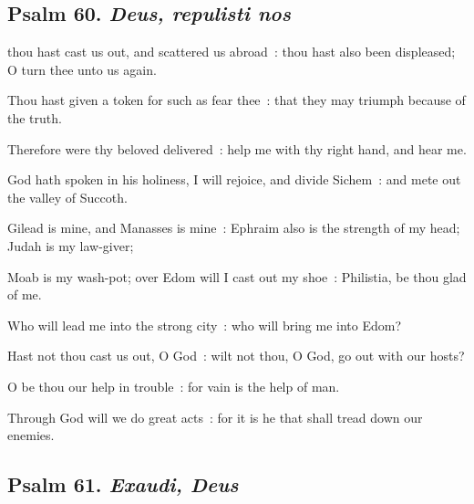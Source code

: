 \subsection{Psalm 60. \textit{Deus, repulisti nos}}

 thou hast cast us out, and scattered us abroad~: thou hast also been displeased; O turn thee unto us again.\par
{}
Thou hast given a token for such as fear thee~: that they may triumph because of the truth.\par
{}Therefore were thy beloved delivered~: help me with thy right hand, and hear me.\par
{}God hath spoken in his holiness, I will rejoice, and divide Sichem~: and mete out the valley of Succoth.\par
{}Gilead is mine, and Manasses is mine~: Ephraim also is the strength of my head; Judah is my law-giver;\par
{}Moab is my wash-pot; over Edom will I cast out my shoe~: Philistia, be thou glad of me.\par
{}Who will lead me into the strong city~: who will bring me into Edom?\par
{}Hast not thou cast us out, O God~: wilt not thou, O God, go out with our hosts?\par
{}O be thou our help in trouble~: for vain is the help of man.\par
{}Through God will we do great acts~: for it is he that shall tread down our enemies.\par

\clearpage
\subsection{Psalm 61. \textit{Exaudi, Deus}}

